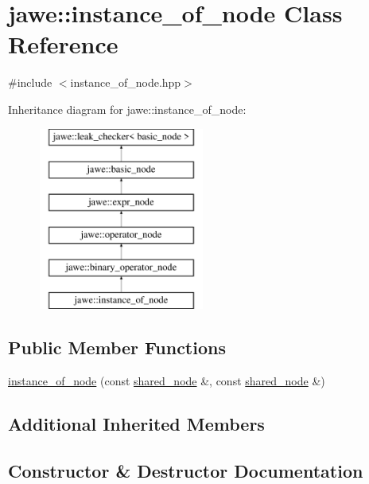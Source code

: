 \hypertarget{classjawe_1_1instance__of__node}{}\section{jawe\+:\+:instance\+\_\+of\+\_\+node Class Reference}
\label{classjawe_1_1instance__of__node}


{\ttfamily \#include $<$instance\+\_\+of\+\_\+node.\+hpp$>$}

Inheritance diagram for jawe\+:\+:instance\+\_\+of\+\_\+node\+:\begin{figure}[H]
\begin{center}
\leavevmode
\includegraphics[height=6.000000cm]{classjawe_1_1instance__of__node}
\end{center}
\end{figure}
\subsection*{Public Member Functions}
\begin{DoxyCompactItemize}
\item 
\hyperlink{classjawe_1_1instance__of__node_ada497112de1c0a198b4410b631ae1a5b}{instance\+\_\+of\+\_\+node} (const \hyperlink{namespacejawe_a3f307481d921b6cbb50cc8511fc2b544}{shared\+\_\+node} \&, const \hyperlink{namespacejawe_a3f307481d921b6cbb50cc8511fc2b544}{shared\+\_\+node} \&)
\end{DoxyCompactItemize}
\subsection*{Additional Inherited Members}


\subsection{Constructor \& Destructor Documentation}
\mbox{\label{classjawe_1_1instance__of__node_ada497112de1c0a198b4410b631ae1a5b}} 
